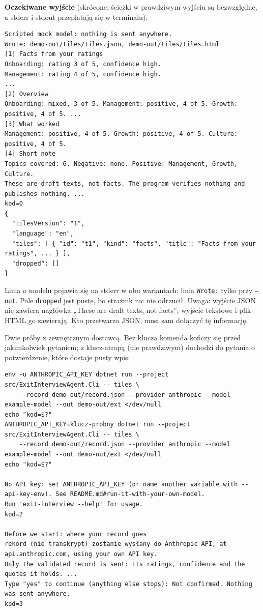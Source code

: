 {\textbf{Oczekiwane wyjście} (skrócone; ścieżki w prawdziwym wyjściu są bezwzględne,
a stderr i stdout przeplatają się w terminalu):

\begin{Verbatim}[fontsize=\scriptsize,frame=single,framesep=2mm]
Scripted mock model: nothing is sent anywhere.
Wrote: demo-out/tiles/tiles.json, demo-out/tiles/tiles.html
[1] Facts from your ratings
Onboarding: rating 3 of 5, confidence high.
Management: rating 4 of 5, confidence high.
...
[2] Overview
Onboarding: mixed, 3 of 5. Management: positive, 4 of 5. Growth: positive, 4 of 5. ...
[3] What worked
Management: positive, 4 of 5. Growth: positive, 4 of 5. Culture: positive, 4 of 5.
[4] Short note
Topics covered: 6. Negative: none. Positive: Management, Growth, Culture.
These are draft texts, not facts. The program verifies nothing and publishes nothing. ...
kod=0
{
  "tilesVersion": "1",
  "language": "en",
  "tiles": [ { "id": "t1", "kind": "facts", "title": "Facts from your ratings", ... } ],
  "dropped": []
}
\end{Verbatim}

Linia o modelu pojawia się na stderr w obu wariantach; linia \texttt{Wrote:} tylko przy
\texttt{--out}. Pole \texttt{dropped} jest puste, bo strażnik nic nie odrzucił.
Uwaga: wyjście JSON nie zawiera nagłówka „These are draft texts, not facts”; wyjście
tekstowe i plik HTML go zawierają. Kto przetwarza JSON, musi sam dołączyć tę informację.

Dwie próby z zewnętrznym dostawcą. Bez klucza komenda kończy się przed jakimkolwiek
pytaniem; z klucz-atrapą (nie prawdziwym) dochodzi do pytania o potwierdzenie, które
dostaje pusty wpis:

\begin{Verbatim}[fontsize=\scriptsize,frame=single,framesep=2mm]
env -u ANTHROPIC_API_KEY dotnet run --project src/ExitInterviewAgent.Cli -- tiles \
    --record demo-out/record.json --provider anthropic --model example-model --out demo-out/ext </dev/null
echo "kod=$?"
ANTHROPIC_API_KEY=klucz-probny dotnet run --project src/ExitInterviewAgent.Cli -- tiles \
    --record demo-out/record.json --provider anthropic --model example-model --out demo-out/ext </dev/null
echo "kod=$?"

No API key: set ANTHROPIC_API_KEY (or name another variable with --api-key-env). See README.md#run-it-with-your-own-model.
Run 'exit-interview --help' for usage.
kod=2

Before we start: where your record goes
rekord (nie transkrypt) zostanie wysłany do Anthropic API, at api.anthropic.com, using your own API key.
Only the validated record is sent: its ratings, confidence and the quotes it holds. ...
Type "yes" to continue (anything else stops): Not confirmed. Nothing was sent anywhere.
kod=3
\end{Verbatim}

}

